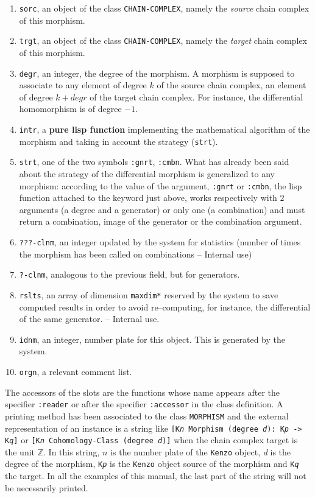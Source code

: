\begin{enumerate}
\item {\tt sorc}, an object of the class {\tt CHAIN-COMPLEX}, namely the {\em source} chain complex
of this morphism.
\item {\tt trgt}, an object of the class {\tt CHAIN-COMPLEX}, namely the {\em target} chain complex of this morphism.
\item {\tt degr}, an integer, the degree of the morphism. A morphism is supposed to associate
to any element of degree $k$ of the source chain complex, an element of degree $k + degr$ of the
target chain complex. For instance, the differential homomorphism is of degree $-1$.
\item {\tt intr}, a {\bf pure lisp function} implementing the mathematical algorithm of the morphism and
taking in account the strategy ({\tt strt}).
\item {\tt strt}, one of the two symbols {\tt :gnrt}, {\tt :cmbn}. What has already been  said about
the strategy of the differential morphism is generalized to any morphism: according
to the value of the argument, {\tt :gnrt} or {\tt :cmbn}, the lisp function attached to the keyword just above,
works respectively with $2$ arguments (a degree and a generator) or
only one (a combination) and must return a combination, image of the generator or the combination argument.
\item {\tt ???-clnm}, an integer updated by the system for statistics (number of times the
morphism has been called on combinations -- Internal use)
\item {\tt ?-clnm}, analogous to the previous field, but for generators.
\item {\tt rslts}, an array of dimension {\tt *maxdim*} reserved by the system to save  computed
results in order to avoid  re--computing, for instance, the differential of the same
generator. -- Internal use.
\item {\tt idnm}, an integer, number plate for this object. This is generated by
the system.
\item {\tt orgn}, a relevant comment list.
\end{enumerate}
The accessors of the slots are the functions whose name appears after the specifier {\tt :reader}
or after the specifier {\tt :accessor} in the class definition.
A printing method has been associated to the class {\tt MORPHISM}
and the external representation of  an instance is a string like
{\tt [K{\em n} Morphism (degree {\em d}): K{\em p} -> K{\em q}]}
or {\tt [K{\em n} Cohomology-Class (degree {\em d})]}
when the chain complex target is the unit $\mathbb{Z}$. In this
string,  $n$ is the number plate of the {\tt Kenzo} object, {\em d} is the degree of the morphism,
{\tt K{\em p}} is the {\tt Kenzo} object source of the morphism and {\tt K{\em q}} the target.
In all the  examples of this manual, the last part of the string will not be necessarily printed.

